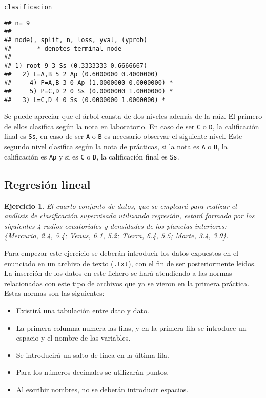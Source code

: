 \documentclass[12pt]{report}\usepackage[]{graphicx}\usepackage[dvipsnames]{xcolor}
\makeatletter
\newcommand{\hlstd}[1]{\textcolor[rgb]{0.345,0.345,0.345}{#1}}%
\newenvironment{kframe}{%
 \def\at@end@of@kframe{}%
 \ifinner\ifhmode%
  \def\at@end@of@kframe{\end{minipage}}%
  \begin{minipage}{\columnwidth}%
 \fi\fi%
 \def\FrameCommand##1{\hskip\@totalleftmargin \hskip-\fboxsep
 \colorbox{shadecolor}{##1}\hskip-\fboxsep
     \hskip-\linewidth \hskip-\@totalleftmargin \hskip\columnwidth}%
 \MakeFramed {\advance\hsize-\width
   \@totalleftmargin\z@ \linewidth\hsize
   \@setminipage}}%
 {\par\unskip\endMakeFramed%
 \at@end@of@kframe}
\newenvironment{knitrout}{}{} %
\newtheorem{exercise}{Ejercicio}[section]
\makeatother
\begin{document}
\begin{knitrout}
\color{fgcolor}\begin{kframe}
\begin{alltt}
\hlstd{clasificacion}
\end{alltt}
\begin{verbatim}
## n= 9 
## 
## node), split, n, loss, yval, (yprob)
##       * denotes terminal node
## 
## 1) root 9 3 Ss (0.3333333 0.6666667)  
##   2) L=A,B 5 2 Ap (0.6000000 0.4000000)  
##     4) P=A,B 3 0 Ap (1.0000000 0.0000000) *
##     5) P=C,D 2 0 Ss (0.0000000 1.0000000) *
##   3) L=C,D 4 0 Ss (0.0000000 1.0000000) *
\end{verbatim}
\end{kframe}
\end{knitrout}
				
				Se puede apreciar que el árbol consta de dos niveles además de la raíz. El primero de ellos clasifica según la nota en laboratorio. En caso de ser \texttt{C} o \texttt{D}, la calificación final es \texttt{Ss}, en caso de ser \texttt{A} o \texttt{B} es necesario observar el siguiente nivel. Este segundo nivel clasifica según la nota de prácticas, si la nota es \texttt{A} o \texttt{B}, la calificación es \texttt{Ap} y si es \texttt{C} o \texttt{D}, la calificación final es \texttt{Ss}.
		
		\subsection{Regresión lineal}
		
			\begin{exercise}
				El cuarto conjunto de datos, que se empleará para realizar el análisis de clasificación supervisada utilizando regresión, estará formado por los siguientes 4 radios ecuatoriales y densidades de los planetas interiores:
				\{Mercurio, 2.4, 5.4; Venus, 6.1, 5.2; Tierra, 6.4, 5.5; Marte, 3.4, 3.9\}.
			\end{exercise}
			
			Para empezar este ejercicio se deberán introducir los datos expuestos en el enunciado en un archivo de texto (\texttt{.txt}), con el fin de ser posteriormente leídos. La inserción de los datos en este fichero se hará atendiendo a las normas relacionadas con este tipo de archivos que ya se vieron en la primera práctica. Estas normas son las siguientes:
			
			\begin{itemize}
				\item Existirá una tabulación entre dato y dato. 
				\item La primera columna numera las filas, y en la primera fila se introduce un espacio y el nombre de las variables. 
				\item Se introducirá un salto de línea en la última fila. 
				\item Para los números decimales se utilizarán puntos. 
				\item Al escribir nombres, no se deberán introducir espacios. 
			\end{itemize}
			
\end{document}
